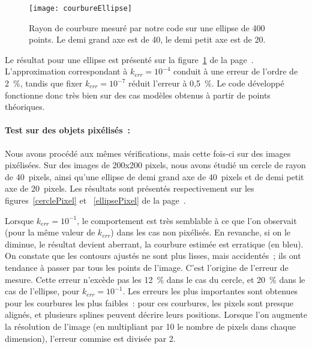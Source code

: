 \begin{figure}[!p]
\centering
\texttt{[image: courbureEllipse]}
\caption{Rayon de courbure mesuré par notre code sur une ellipse de 400 points. Le demi grand axe est de 40, le demi petit axe est de 20.}
\label{courbureEllipse}
\end{figure}
Le résultat pour une ellipse est présenté sur la figure~\ref{courbureEllipse} de la page~\pageref{courbureEllipse}. L'approximation correspondant à $k_{err} = 10^{-4}$ conduit à une erreur de l'ordre de 2~\%, tandis que fixer $k_{err} = 10^{-7}$ réduit l'erreur à 0,5~\%. Le code développé fonctionne donc très bien sur des cas modèles
obtenus à partir de points théoriques.\par 

\paragraph*{Test sur des objets pixélisés~:} Nous avons procédé aux mêmes vérifications, mais cette fois-ci sur des images pixélisées. Sur des images de 200x200 pixels, nous avons étudié un cercle de rayon de 40~pixels, ainsi qu'une ellipse de demi grand axe de 40~pixels et de demi petit axe de 20~pixels. Les résultats sont présentés respectivement sur les figures~\ref{cerclePixel} et ~\ref{ellipsePixel} de la page~\pageref{cerclePixel}.\par 
Lorsque $k_{err} = 10^{-1}$, le comportement est très semblable à ce que l'on observait (pour la même valeur de $k_{err}$) dans les cas non pixélisés. En revanche, si on le diminue, le résultat devient aberrant, la courbure estimée est erratique (en bleu). On constate que les contours ajustés ne sont plus lisses, mais accidentés~; ils ont
tendance à passer par tous les points de l'image. C'est l'origine de l'erreur de mesure. Cette erreur n'excède pas les 12~\% dans le cas du cercle, et 20~\% dans le cas de l'ellipse, pour $k_{err} = 10^{-1}$. Les erreurs les plus importantes sont obtenues pour les courbures les plus faibles~: pour ces courbures, les pixels sont presque alignés, et plusieurs splines peuvent décrire leurs positions. Lorsque l'on augmente la résolution de l'image (en multipliant par 10 le nombre de pixels dans chaque
dimension), l'erreur commise est divisée par 2.\par 
